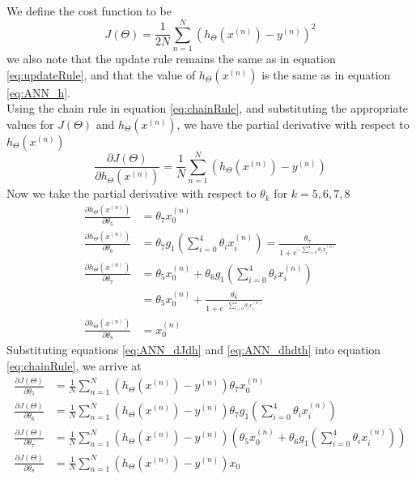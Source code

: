 \documentclass [11pt]{article}
\begin{document}
\subsection{}
We define the cost function to be
\begin{equation}\label{eq:ANN_costFunction}
J(\Theta) = \frac{1}{2N}\sum_{n=1}^{N}(h_{\Theta}(x^{(n)})-y^{(n)})^2
\end{equation}
we also note that the update rule remains the same as in equation \ref{eq:updateRule}, and that the value of $h_{\Theta}(x^{(n)})$ is the same as in equation \ref{eq:ANN_h}.
\\
Using the chain rule in equation \ref{eq:chainRule}, and substituting the appropriate values for $J(\Theta)$ and $h_{\Theta}(x^{(n)})$, we have the partial derivative with respect to $h_{\Theta}(x^{(n)})$
\begin{equation}\label{eq:ANN_dJdh}
\frac{\partial J(\Theta)}{\partial h_{\Theta}(x^{(n)})} = \frac{1}{N}\sum_{n=1}^{N}(h_{\Theta}(x^{(n)})-y^{(n)})
\end{equation}
Now we take the partial derivative with respect to $\theta_{k}$ for $k = 5,6,7,8$
\begin{equation}\label{eq:ANN_dhdth}
\begin{split}
\frac{\partial h_{\Theta}(x^{(n)})}{\partial \theta_{5}} & = \theta_{7}x_{0}^{(n)} \\
\frac{\partial h_{\Theta}(x^{(n)})}{\partial \theta_{6}} & = \theta_{7}g_{1}(\sum_{i=0}^{4}\theta_{i}x_{i}^{(n)}) = \frac{\theta_{7}}{1+e^{-\sum_{i=0}^{4}\theta_{i}x_{i}^{(n)}}} \\
\frac{\partial h_{\Theta}(x^{(n)})}{\partial \theta_{7}} & = \theta_{5}x_{0}^{(n)}+\theta_{6}g_{1}(\sum_{i=0}^{4}\theta_{i}x_{i}^{(n)}) \\
& = \theta_{5}x_{0}^{(n)} + \frac{\theta_{6}}{1+e^{-\sum_{i=0}^{4}\theta_{i}x_{i}^{(n)}}} \\
\frac{\partial h_{\Theta}(x^{(n)})}{\partial \theta_{8}} & = x_{0}^{(n)}
\end{split}
\end{equation}
Substituting equations \ref{eq:ANN_dJdh} and \ref{eq:ANN_dhdth} into equation \ref{eq:chainRule}, we arrive at
\begin{equation*}
\begin{split}
\frac{\partial J(\Theta)}{\partial \theta_{5}} & = \frac{1}{N}\sum_{n=1}^{N}(h_{\Theta}(x^{(n)})-y^{(n)}) \theta_{7}x_{0}^{(n)} \\
\frac{\partial J(\Theta)}{\partial \theta_{6}} & = \frac{1}{N}\sum_{n=1}^{N}(h_{\Theta}(x^{(n)})-y^{(n)})\theta_{7}g_{1}(\sum_{i=0}^{4}\theta_{i}x_{i}^{(n)}) \\
\frac{\partial J(\Theta)}{\partial \theta_{7}} & = \frac{1}{N}\sum_{n=1}^{N}(h_{\Theta}(x^{(n)})-y^{(n)})(\theta_{5}x_{0}^{(n)}+\theta_{6}g_{1}(\sum_{i=0}^{4}\theta_{i}x_{i}^{(n)})) \\
\frac{\partial J(\Theta)}{\partial \theta_{8}} & = \frac{1}{N}\sum_{n=1}^{N}(h_{\Theta}(x^{(n)})-y^{(n)})x_{0}
\end{split}
\end{equation*}
\end{document}
